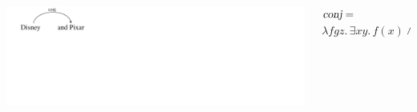 \documentclass[mathserif,12pt]{beamer}
\newcommand \ignore[1]{}
\renewcommand{\land}{\wedge}
\newcommand{\lspace}{.\,}
\begin{document}
\begin{frame}
  \vspace{0.6cm}
 \begin{columns}
  \begin{column}{0.39\textwidth}
   \centering
\includegraphics[trim=1em 9em 28em 0em,clip=true,scale=1.3]{figures/conj}   
  \end{column}
  \begin{column}{0.61\textwidth}
\large    $\textsl{conj} =$ \\ $ \lambda f g z \lspace \exists x y \lspace f(x) \land g(y) \land \mathrm{coord}(z,x,y)$ 
  \end{column}
 \end{columns}
\end{frame}

\ignore{
\begin{frame}[noframenumbering]
\frametitle{Dependencies to Logical Forms}
 \begin{block}{}
 \vspace{2cm}
  \centering \Huge
  Total number of rules: 46
  \vspace{2cm}
  \end{block}
\end{frame}
}
\end{document}
